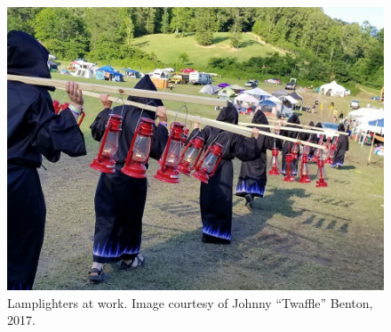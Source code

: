 \vfill
\begin{figure}[H]
\includegraphics[width=\textwidth]{images/lamplighters.jpeg}
\caption{Lamplighters at work. Image courtesy of Johnny “Twaffle” Benton, 2017.}
\label{fig:lamplighters2017}
\end{figure}
